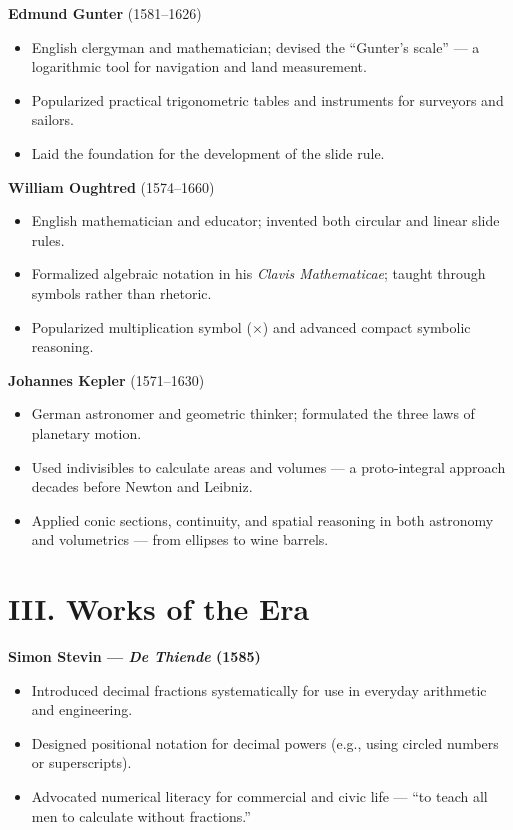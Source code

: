 \documentclass[9pt]{article}
\begin{document}
\textbf{Edmund Gunter} (1581–1626)

\begin{itemize}
    \item English clergyman and mathematician; devised the “Gunter’s scale” — a logarithmic tool for navigation and land measurement.
    \item Popularized practical trigonometric tables and instruments for surveyors and sailors.
    \item Laid the foundation for the development of the slide rule.
\end{itemize}

\textbf{William Oughtred} (1574–1660)

\begin{itemize}
    \item English mathematician and educator; invented both circular and linear slide rules.
    \item Formalized algebraic notation in his \textit{Clavis Mathematicae}; taught through symbols rather than rhetoric.
    \item Popularized multiplication symbol ($\times$) and advanced compact symbolic reasoning.
\end{itemize}

\textbf{Johannes Kepler} (1571–1630)

\begin{itemize}
    \item German astronomer and geometric thinker; formulated the three laws of planetary motion.
    \item Used indivisibles to calculate areas and volumes — a proto-integral approach decades before Newton and Leibniz.
    \item Applied conic sections, continuity, and spatial reasoning in both astronomy and volumetrics — from ellipses to wine barrels.
\end{itemize}



\newpage


\section*{III. Works of the Era}

\textbf{Simon Stevin — \textit{De Thiende} (1585)}

\begin{itemize}
    \item Introduced decimal fractions systematically for use in everyday arithmetic and engineering.
    \item Designed positional notation for decimal powers (e.g., using circled numbers or superscripts).
    \item Advocated numerical literacy for commercial and civic life — ``to teach all men to calculate without fractions.''
\end{itemize}
\end{document}
